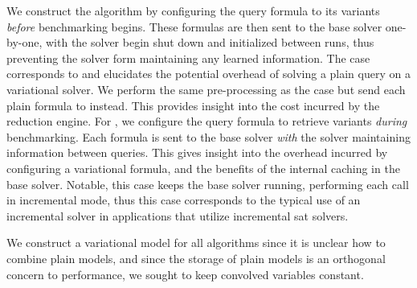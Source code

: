 We construct the \pTop{} algorithm by configuring the query formula to its
variants \textit{before} benchmarking begins. These formulas are then sent to
the base solver one-by-one, with the solver begin shut down and initialized
between runs, thus preventing the solver form maintaining any learned
information.
%
The \pTov{} case corresponds to  and elucidates the potential overhead
of solving a plain query on a variational solver. We perform the same
pre-processing as the \pTop{} case but send each plain formula to \vsat{}
instead. This provides insight into the cost incurred by the reduction engine.
%
For \vTop{}, we configure the query formula to retrieve variants \textit{during}
benchmarking. Each formula is sent to the base solver \textit{with} the solver
maintaining information between queries. This gives insight into the overhead
incurred by configuring a variational formula, and the benefits of the internal
caching in the base solver. Notable, this case keeps the base solver running,
performing each call in incremental mode, thus this case corresponds to the
typical use of an incremental solver in applications that utilize incremental
\ac{sat} solvers.

We construct a variational model for all algorithms since it is unclear how to
combine plain models, and since the storage of plain models is an orthogonal
concern to performance, we sought to keep convolved variables constant.

